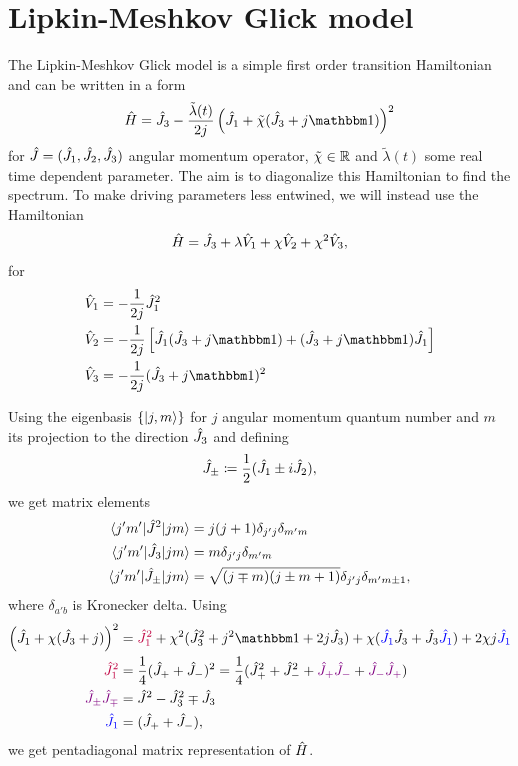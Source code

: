 \chapter{Lipkin-Meshkov Glick model}
The Lipkin-Meshkov Glick model is a simple first order transition Hamiltonian and can be written in a form
\begin{equation}
    \HH=\J_3-\frac{\tilde\lambda(t)}{2j}\left(\J_1+\tilde\chi(\J_3+j\Id)\right)^2
    \label{eq:firstOrderTransitionHamiltonianOriginal}
\end{equation}
for $\hat{J}=(\hat{J}_1,\hat{J}_2,\hat{J}_3)$ angular momentum operator, $\tilde\chi\in\mathbb{R}$ and $\tilde\lambda(t)$ some real time dependent parameter. The aim is to diagonalize this Hamiltonian to find the spectrum. To make driving parameters less entwined, we will instead use the Hamiltonian
\begin{equation}
    \hat{H}=\hat{J}_3+\lambda\hat V_1 +\chi \hat V_2+\chi^2 \hat V_3,
    \label{eq:firstOrderTransitionHamiltonian}
\end{equation}
for
\begin{align}
    \hat V_1 &=-\frac{1}{2j}\J_1^2\\
    \hat V_2 &= -\frac{1}{2j}\left[\J_1(\J_3+j\Id)+(\J_3+j\Id)\J_1\right]\\
    \hat V_3 &= -\frac{1}{2j}(\J_3+j\Id)^2
\end{align}



Using the eigenbasis $\{\ket{j,m}\}$ for $j$ angular momentum quantum number and $m$ its projection to the direction $\hat{J}_3$ and defining
\begin{equation}
    \hat{J}_\pm\coloneqq\frac{1}{2}(\hat{J}_1\pm i\hat{J}_2),
\end{equation}
we get matrix elements
\begin{align}
    \braket{j'm'|\hat{J}^2|jm} &= j(j+1)\delta_{j'j}\delta_{m'm}\\
    \braket{j'm'|\hat{J}_3|jm} &= m \delta_{j'j}\delta_{m'm}\\
    \braket{j'm'|\hat{J}_\pm|jm} &= \sqrt{(j\mp m)(j\pm m+1)}\delta_{j'j}\delta_{m'm\pm 1},
\end{align}
where $\delta_{a'b}$ is Kronecker delta. Using
\begin{align}
        \left(\J_1+\chi(\J_3+j)\right)^2 &= \textcolor{purple}{\J_1^2} +\chi^2 (\J_3^2+j^2\Id+2j\J_3)+\chi(\textcolor{blue}{\J_1}\J_3+\J_3\textcolor{blue}{\J_1})+2\chi j\textcolor{blue}{\J_1}\\
        \textcolor{purple}{\J_1^2}&= \frac{1}{4}(\J_++\J_-)^2= \frac{1}{4}(\J_+^2+\J_-^2+\textcolor{violet}{\J_+\J_-}+\textcolor{violet}{\J_-\J_+})\\ 
        \textcolor{violet}{\J_\pm\J_\mp}&=\J^2-\J_3^2 \mp \J_3\\
        \textcolor{blue}{\J_1}&=(\J_+ +\J_-),
\end{align}
we get pentadiagonal matrix representation of $\hat{H}$. 

